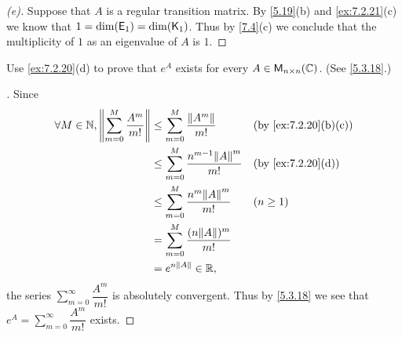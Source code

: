 \begin{proof}[(e)]
  Suppose that \(A\) is a regular transition matrix.
  By \cref{5.19}(b) and \cref{ex:7.2.21}(c) we know that \(1 = \dim(\mathsf{E}_1) = \dim(\mathsf{K}_1)\).
  Thus by \cref{7.4}(c) we conclude that the multiplicity of \(1\) as an eigenvalue of \(A\) is \(1\).
\end{proof}

\begin{ex}\label{ex:7.2.22}
  Use \cref{ex:7.2.20}(d) to prove that \(e^A\) exists for every \(A \in \ms[n][n][\C]\).
  (See \cref{5.3.18}.)
\end{ex}

\begin{proof}[]
  Since
  \begin{align*}
    \forall M \in \N, \norm{\sum_{m = 0}^M \dfrac{A^m}{m!}} & \leq \sum_{m = 0}^M \dfrac{\norm{A^m}}{m!}           &  & \by{ex:7.2.20}[b,c] \\
                                                            & \leq \sum_{m = 0}^M \dfrac{n^{m - 1} \norm{A}^m}{m!} &  & \by{ex:7.2.20}[d]   \\
                                                            & \leq \sum_{m = 0}^M \dfrac{n^m \norm{A}^m}{m!}       &  & (n \geq 1)          \\
                                                            & = \sum_{m = 0}^M \dfrac{(n \norm{A})^m}{m!}                                   \\
                                                            & = e^{n \norm{A}} \in \R,
  \end{align*}
  the series \(\sum_{m = 0}^\infty \dfrac{A^m}{m!}\) is absolutely convergent.
  Thus by \cref{5.3.18} we see that \(e^A = \sum_{m = 0}^\infty \dfrac{A^m}{m!}\) exists.
\end{proof}

